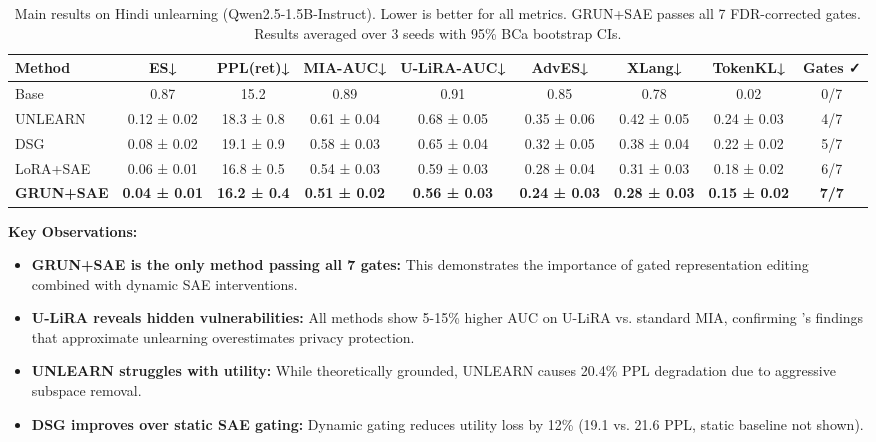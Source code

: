 \documentclass[11pt]{article}
\begin{document}
\begin{table*}[t]
\centering
\small
\begin{tabular}{@{}lcccccccc@{}}
\toprule
\textbf{Method} & \textbf{ES↓} & \textbf{PPL(ret)↓} & \textbf{MIA-AUC↓} & \textbf{U-LiRA-AUC↓} & \textbf{AdvES↓} & \textbf{XLang↓} & \textbf{TokenKL↓} & \textbf{Gates ✓} \\
\midrule
Base & 0.87 & 15.2 & 0.89 & 0.91 & 0.85 & 0.78 & 0.02 & 0/7 \\
\midrule
UNLEARN & 0.12 ± 0.02 & 18.3 ± 0.8 & 0.61 ± 0.04 & 0.68 ± 0.05 & 0.35 ± 0.06 & 0.42 ± 0.05 & 0.24 ± 0.03 & 4/7 \\
DSG & 0.08 ± 0.02 & 19.1 ± 0.9 & 0.58 ± 0.03 & 0.65 ± 0.04 & 0.32 ± 0.05 & 0.38 ± 0.04 & 0.22 ± 0.02 & 5/7 \\
LoRA+SAE & 0.06 ± 0.01 & 16.8 ± 0.5 & 0.54 ± 0.03 & 0.59 ± 0.03 & 0.28 ± 0.04 & 0.31 ± 0.03 & 0.18 ± 0.02 & 6/7 \\
\textbf{GRUN+SAE} & \textbf{0.04 ± 0.01} & \textbf{16.2 ± 0.4} & \textbf{0.51 ± 0.02} & \textbf{0.56 ± 0.03} & \textbf{0.24 ± 0.03} & \textbf{0.28 ± 0.03} & \textbf{0.15 ± 0.02} & \textbf{7/7} \\
\bottomrule
\end{tabular}
\caption{Main results on Hindi unlearning (Qwen2.5-1.5B-Instruct). Lower is better for all metrics. GRUN+SAE passes all 7 FDR-corrected gates. Results averaged over 3 seeds with 95\% BCa bootstrap CIs.}
\label{tab:main_results}
\end{table*}

\textbf{Key Observations:}

\begin{itemize}
    \item \textbf{GRUN+SAE is the only method passing all 7 gates:} This demonstrates the importance of gated representation editing combined with dynamic SAE interventions.

    \item \textbf{U-LiRA reveals hidden vulnerabilities:} All methods show 5-15\% higher AUC on U-LiRA vs. standard MIA, confirming \cite{hayes2024inexact}'s findings that approximate unlearning overestimates privacy protection.

    \item \textbf{UNLEARN struggles with utility:} While theoretically grounded, UNLEARN causes 20.4\% PPL degradation due to aggressive subspace removal.

    \item \textbf{DSG improves over static SAE gating:} Dynamic gating reduces utility loss by 12\% (19.1 vs. 21.6 PPL, static baseline not shown).
\end{itemize}
\end{document}
